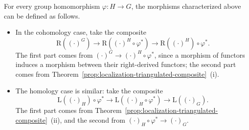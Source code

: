 \begin{lemma}\label{prop:change-of-groups-alt}
	For every group homomorphism $\varphi:H\to G$, the morphisms characterized
	above can be defined as follows.
	\begin{itemize}
		\item In the cohomology case, take the composite
		\begin{equation}\label{eqn:change-of-group-dec-1}
			\mathrm{R}\left( (\cdot)^G \right) \to \mathrm{R}\left( (\cdot)^H \circ \varphi^* \right) \to \mathrm{R}\left( (\cdot)^H \right) \circ \varphi^* .
		\end{equation}
		The first part comes from
		$(\cdot)^G\to(\cdot)^H\circ\varphi^*$, since a morphism of functors
		induces a morphism between their right-derived functors; the second
		part comes from
		Theorem~\ref{prop:localization-triangulated-composite}~(i).
		\item The homology case is similar: take the composite
		\begin{equation}\label{eqn:change-of-group-dec-2}
			\mathrm{L}\left( (\cdot)_H \right) \circ \varphi^* \to \mathrm{L} \left( (\cdot)_H \circ \varphi^* \right) \to \mathrm{L}\left( (\cdot)_G \right).
		\end{equation}
		The first part comes from
		Theorem~\ref{prop:localization-triangulated-composite}~(ii), and the
		second from $(\cdot)_H\circ\varphi^*\to(\cdot)_G$.
	\end{itemize}
\end{lemma}
